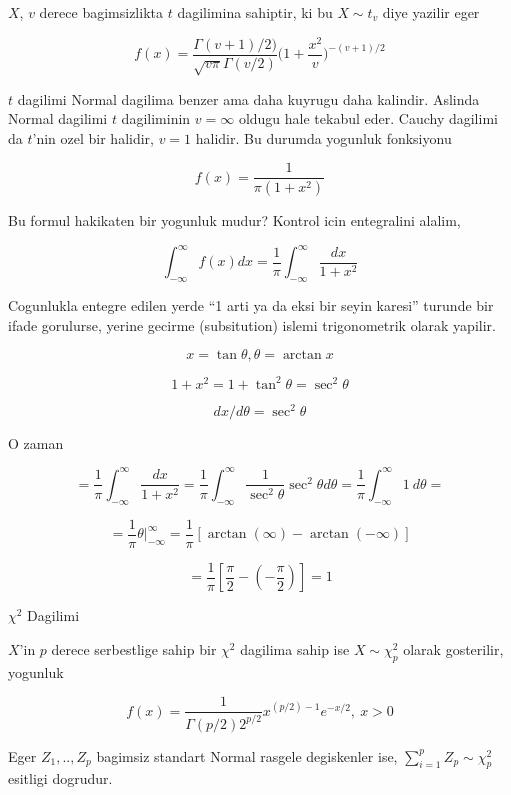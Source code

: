 \documentclass[12pt,fleqn]{article}\usepackage{../common}
\begin{document}
$X$, $v$ derece bagimsizlikta $t$ dagilimina sahiptir, ki bu $X \sim t_v$
diye yazilir eger 

$$ f(x) = 
\frac{ \Gamma(v+1)/2)} {\sqrt{v\pi}\Gamma(v/2)}
\bigg(1 + \frac{ x^2}{v}\bigg)^{-(v+1)/2}
 $$

$t$ dagilimi Normal dagilima benzer ama daha kuyrugu daha kalindir. Aslinda
Normal dagilimi $t$ dagiliminin $v = \infty$ oldugu hale tekabul
eder. Cauchy dagilimi da $t$'nin ozel bir halidir, $v = 1$ halidir. Bu
durumda yogunluk fonksiyonu

$$ f(x)  = \frac{ 1}{\pi(1+ x^2)} $$

Bu formul hakikaten bir yogunluk mudur? Kontrol icin entegralini alalim, 

$$ \int _{ -\infty}^{\infty} f(x) dx = 
\frac{ 1}{\pi} \int _{ -\infty}^{\infty} \frac{ dx}{1 + x^2} 
 $$

Cogunlukla entegre edilen yerde  ``1 arti ya da eksi bir seyin karesi''
turunde  bir ifade gorulurse, yerine gecirme (subsitution) islemi
trigonometrik  olarak  yapilir. 

$$  x = \tan \theta, \theta = \arctan x $$

$$ 1 + x^2 = 1 + \tan^2\theta = \sec^2\theta$$

$$ dx / d\theta = \sec^2\theta $$

O zaman 

$$ =
\frac{ 1}{\pi} \int _{ -\infty}^{\infty} \frac{ dx}{1 + x^2}   =
\frac{ 1}{\pi} \int _{ -\infty}^{\infty}  \frac{ 1}{\sec^2\theta}\sec^2\theta d\theta = 
\frac{ 1}{\pi} \int _{ -\infty}^{\infty}  1 \ d\theta = 
 $$

$$ = 
\frac{ 1}{\pi} \theta | _{ -\infty}^{\infty}   = 
\frac{ 1}{\pi} [\arctan(\infty) - \arctan(-\infty)]
 $$

$$ =
\frac{ 1}{\pi} [\frac{ \pi}{2} - (-\frac{ \pi}{2}) ] = 1
 $$


$\chi^2$ Dagilimi

$X$'in $p$ derece serbestlige sahip bir $\chi^2$ dagilima sahip ise $X \sim
\chi^2_p$ olarak gosterilir, yogunluk 

$$ f(x) = \frac{ 1}{\Gamma(p/2) 2^{p/2}} x^{(p/2) - 1} e^{-x/2 }, \ x > 0 $$

Eger $Z_1, .. , Z_p$ bagimsiz standart Normal rasgele degiskenler ise,
$\sum _{ i=1}^{p} Z_p \sim \chi^2_p$ esitligi dogrudur. 
\end{document}
